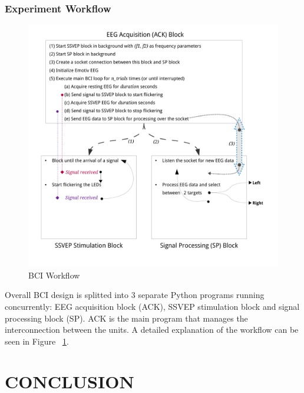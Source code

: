 \documentclass[12pt]{article}
\newcommand\mysection[1]{\vspace*{-0.35cm}\section{#1}\vspace*{6pt}\thispagestyle{empty}}
\newcommand\mysubsubsection[1]{\subsubsection{#1}}
\numberwithin{equation}{section}
\numberwithin{figure}{section}
\numberwithin{table}{section}
\begin{document}
\mysubsubsection{Experiment Workflow}
\par{
    \begin{figure}[ht]
        \centering
        \includegraphics[scale=0.65]{images/workflow}
        \caption{BCI Workflow}
        \label{fig:workflow}
    \end{figure}
    Overall BCI design is splitted into 3 separate Python programs
    running concurrently: EEG acquisition block (ACK), SSVEP stimulation block
    and signal processing block (SP). ACK is the main program
    that manages the interconnection between the units. A detailed explanation
    of the workflow can be seen in Figure ~\ref{fig:workflow}.
}


\clearpage
\vspace*{-0.35cm}
\mysection{CONCLUSION}
\par{
}


\clearpage
\vspace*{-0.35cm}

\thispagestyle{empty}


\clearpage
\cfoot{}
\vspace*{-0.35cm}
\thispagestyle{empty}
\end{document}
